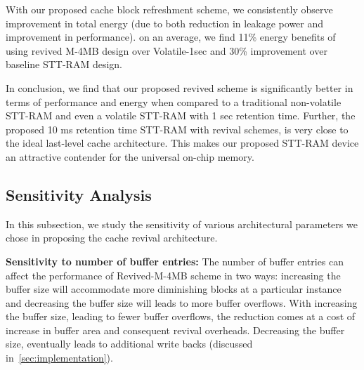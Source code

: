 With our proposed cache block refreshment scheme, we consistently observe improvement in total energy (due to both reduction in leakage power and improvement in performance). on an average, we find 11\% energy benefits of using revived M-4MB design over Volatile-1sec and 30\% improvement over baseline STT-RAM design. 

In conclusion, we find that our proposed revived scheme is significantly better in terms of performance and energy when compared to a traditional non-volatile STT-RAM and even a volatile STT-RAM with 1 sec retention time. Further, the proposed 10 ms retention time STT-RAM with revival schemes, is very close to the ideal last-level cache architecture. This makes our proposed STT-RAM device an attractive contender for the universal on-chip memory.







\subsection{Sensitivity Analysis}
In this subsection, we study the sensitivity of various architectural parameters we chose in proposing the cache revival architecture.

\noindent\textbf{Sensitivity to number of buffer entries:} 
The number of buffer entries can affect the performance of Revived-M-4MB scheme in two ways: increasing the 
buffer size will accommodate more diminishing blocks at a particular instance and decreasing the buffer size will
leads to more buffer overflows. With increasing the buffer size, leading to fewer buffer overflows, 
the reduction comes at a cost of increase in buffer area and consequent revival overheads. Decreasing the buffer size, eventually
leads to additional write backs (discussed in~\ref{sec:implementation}).

